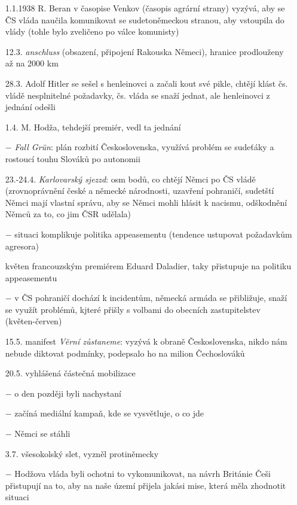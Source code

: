 \documentclass{article}
\begin{document}
\begin{itemize}
    \vspace{-0.5em}
    \setlength\itemsep{0.15em}
    \item[1.1.1938] R. Beran v časopise Venkov (časopis agrární strany) vyzývá, aby se ČS vláda naučila komunikovat se sudetoněmeckou stranou, aby vstoupila do vlády (tohle bylo zveličeno po válce komunisty)
    \item[12.3.] \textit{anschluss} (obsazení, připojení Rakouska Němeci), hranice prodlouženy až na 2000 km
    \item[28.3.] Adolf Hitler se sešel s henleinovci a začali kout své pikle, chtějí klást čs. vládě nesplnitelné požadavky, čs. vláda se snaží jednat, ale henleinovci z jednání odešli
    \item[1.4.] M. Hodža, tehdejší premiér, vedl ta jednání
    \item[$-$] \textit{Fall Grün}: plán rozbití Československa, využívá problém se sudeťáky a rostoucí touhu Slováků po autonomii
    \item[23.-24.4.] \textit{Karlovarský sjezzd}: osm bodů, co chtějí Němci po ČS vládě (zrovnoprávnění české a německé národnosti, uzavření pohraničí, sudetští Němci mají vlastní správu, aby se Němci mohli hlásit k nacismu, odškodnění Němců za to, co jim ČSR udělala)
    \item[$-$] situaci komplikuje politika appeasementu (tendence ustupovat požadavkům agresora)
    \item[květen] francouzským premiérem Eduard Daladier, taky přistupuje na politiku appeasementu
    \item[$-$] v ČS pohraničí dochází k incidentům, německá armáda se přibližuje, snaží se využít problémů, kjteré přišly s volbami do obecních zastupitelstev (květen-červen)
    \item[15.5.] manifest \textit{Věrní zůstaneme}: vyzývá k obraně Československa, nikdo nám nebude diktovat podmínky, podepsalo ho na milion Čechoslováků
    \item[20.5.] vyhlášená částečná mobilizace
    \item[$-$] o den později byli nachystaní
    \item[$-$] začíná mediální kampaň, kde se vysvětluje, o co jde
    \item[$-$] Němci se stáhli
    \item[3.7.] všesokolský slet, vyzněl protiněmecky
    \item[$-$] Hodžova vláda byli ochotni to vykomunikovat, na návrh Británie Češi přistupují na to, aby na naše území přijela jakási mise, která měla zhodnotit situaci

\end{itemize}
\end{document}
